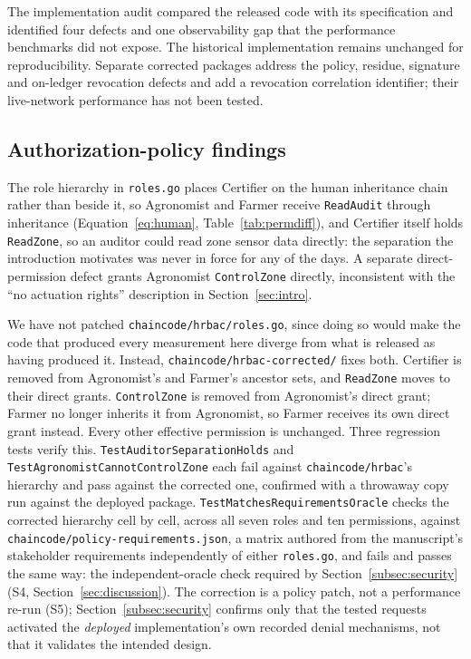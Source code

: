 \documentclass[a4paper,fleqn]{cas-sc}
\begin{document}
The implementation audit compared the released code with its specification
and identified four defects and one observability gap that the performance
benchmarks did not expose. The historical implementation remains unchanged
for reproducibility. Separate corrected packages address the policy,
residue, signature and on-ledger revocation defects and add a revocation
correlation identifier; their live-network performance has not been tested.

\subsection{Authorization-policy findings}
\label{subsec:pm_policy}

The role hierarchy in \texttt{roles.go} places Certifier on the human
inheritance chain rather than beside it, so Agronomist and Farmer receive
\texttt{ReadAudit} through inheritance (Equation~\eqref{eq:human},
Table~\ref{tab:permdiff}), and Certifier itself holds \texttt{ReadZone}, so
an auditor could read zone sensor data directly: the separation the
introduction motivates was never in force for any of the \DeployDays{}
days. A separate direct-permission defect grants Agronomist
\texttt{ControlZone} directly, inconsistent with the ``no actuation
rights'' description in Section~\ref{sec:intro}.

We have not patched \texttt{chaincode/hrbac/roles.go}, since doing so
would make the code that produced every measurement here diverge from
what is released as having produced it. Instead,
\texttt{chaincode/hrbac-corrected/} fixes both. Certifier is removed from
Agronomist's and Farmer's ancestor sets, and \texttt{ReadZone} moves to
their direct grants. \texttt{ControlZone} is removed from Agronomist's
direct grant; Farmer no longer inherits it from Agronomist, so Farmer
receives its own direct grant instead. Every other effective permission is
unchanged. Three regression tests verify this.
\texttt{TestAuditorSeparationHolds} and
\texttt{TestAgronomistCannotControlZone} each fail against
\texttt{chaincode/hrbac}'s hierarchy and pass against the corrected one,
confirmed with a throwaway copy run against the deployed package.
\texttt{TestMatchesRequirementsOracle} checks the corrected hierarchy cell
by cell, across all seven roles and ten permissions, against
\texttt{chaincode/policy-requirements.json}, a matrix authored from the
manuscript's stakeholder requirements independently of either
\texttt{roles.go}, and fails and passes the same way: the independent-oracle
check required by Section~\ref{subsec:security} (S4,
Section~\ref{sec:discussion}). The correction is a policy patch, not a
performance re-run (S5); Section~\ref{subsec:security} confirms only that
the tested requests activated the \emph{deployed} implementation's own
recorded denial mechanisms, not that it validates the intended design.
\end{document}
